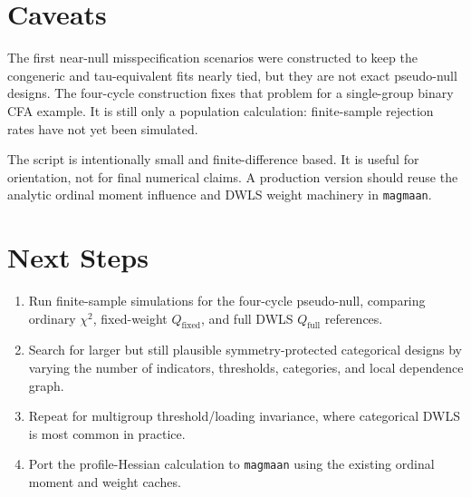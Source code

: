 \documentclass[11pt]{article}
\begin{document}
\section{Caveats}

The first near-null misspecification scenarios were constructed to keep the
congeneric and tau-equivalent fits nearly tied, but they are not exact
pseudo-null designs. The four-cycle construction fixes that problem for a
single-group binary CFA example. It is still only a population calculation:
finite-sample rejection rates have not yet been simulated.

The script is intentionally small and finite-difference based. It is useful for
orientation, not for final numerical claims. A production version should reuse
the analytic ordinal moment influence and DWLS weight machinery in
\texttt{magmaan}.

\section{Next Steps}

\begin{enumerate}
\item Run finite-sample simulations for the four-cycle pseudo-null, comparing
  ordinary $\chi^2$, fixed-weight
  $Q_{\mathrm{fixed}}$, and full DWLS $Q_{\mathrm{full}}$ references.
\item Search for larger but still plausible symmetry-protected categorical
  designs by varying the number of indicators, thresholds, categories, and local
  dependence graph.
\item Repeat for multigroup threshold/loading invariance, where categorical
  DWLS is most common in practice.
\item Port the profile-Hessian calculation to \texttt{magmaan} using the
  existing ordinal moment and weight caches.
\end{enumerate}
\end{document}
